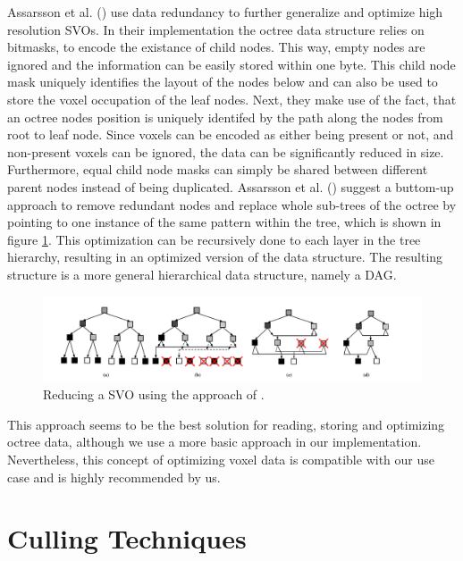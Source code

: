 Assarsson et al. (\cite{Assarsson2013}) use data redundancy to further generalize and optimize high resolution 
\ac{SVO}s. In their implementation the octree data structure relies on bitmasks, to encode the existance of child 
nodes. This way, empty nodes are ignored and the information can be easily stored within one byte. This child node 
mask uniquely identifies the layout of the nodes below and can also be used to store the voxel occupation of the 
leaf nodes. Next, they make use of the fact, that an octree nodes position is uniquely identifed by the path along 
the nodes from root to leaf node. Since voxels can be encoded as either being present or not, and non-present 
voxels can be ignored, the data can be significantly reduced in size. Furthermore, equal child node masks 
can simply be shared between different parent nodes instead of being duplicated. Assarsson et al. (\cite{Assarsson2013}) 
suggest a buttom-up approach to remove redundant nodes and replace whole sub-trees of the octree by pointing to one 
instance of the same pattern within the tree, which is shown in figure \ref{fig:sparse-voxel-dag-creation}. 
This optimization can be recursively done to each layer in the tree hierarchy, resulting in an optimized version 
of the data structure. The resulting structure is a more general hierarchical data structure, namely a \ac{DAG}.

\begin{figure}[h]
    \centering
    \includegraphics[width=\linewidth]{images/graphics/highres-sv-dag.png}
    \caption{Reducing a \ac{SVO} using the approach of \cite{Assarsson2013}.}
    \label{fig:sparse-voxel-dag-creation}
\end{figure}

This approach seems to be the best solution for reading, storing and optimizing octree data, although we use 
a more basic approach in our implementation. Nevertheless, this concept of optimizing voxel data is compatible 
with our use case and is highly recommended by us.

\section{Culling Techniques} \label{sec-culling-techniques}

